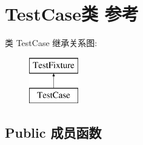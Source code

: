 \hypertarget{class_test_case}{}\section{Test\+Case类 参考}
\label{class_test_case}
类 Test\+Case 继承关系图\+:\begin{figure}[H]
\begin{center}
\leavevmode
\includegraphics[height=2.000000cm]{class_test_case}
\end{center}
\end{figure}
\subsection*{Public 成员函数}
